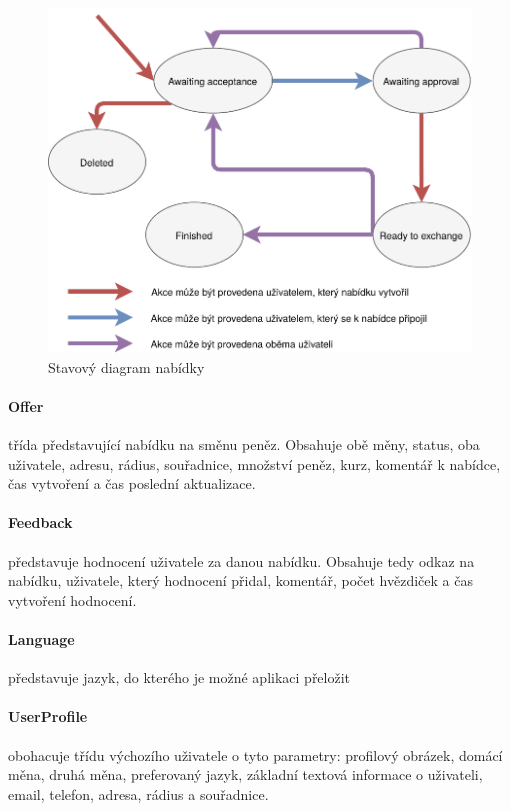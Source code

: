 \begin{figure}[h]
    \centering
    \includegraphics[width=1.0\textwidth]{media/state-diagram}
    \caption{Stavový diagram nabídky}
    \label{fig:implementation:state-diagram}
\end{figure}

\paragraph*{Offer} třída představující nabídku na směnu peněz. Obsahuje obě měny, status, oba uživatele, adresu, rádius, souřadnice, množství peněz, kurz, komentář k nabídce, čas vytvoření a čas poslední aktualizace.
\paragraph*{Feedback} představuje hodnocení uživatele za danou nabídku. Obsahuje tedy odkaz na nabídku, uživatele, který hodnocení přidal, komentář, počet hvězdiček a čas vytvoření hodnocení.
\paragraph*{Language} představuje jazyk, do kterého je možné aplikaci přeložit
\paragraph*{UserProfile} obohacuje třídu výchozího uživatele o tyto parametry: profilový obrázek, domácí měna, druhá měna, preferovaný jazyk, základní textová informace o uživateli, email, telefon, adresa, rádius a souřadnice.


